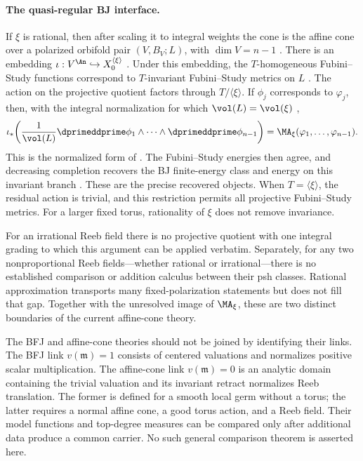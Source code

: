\paragraph{The quasi-regular BJ interface.}
If $\xi$ is rational, then after scaling it to integral weights the cone is
the affine cone over a polarized orbifold pair $(V,B_V;L)$, with
$\dim V=n-1$ \cite[Proposition~2.4]{Wu24AffineCones}.  There is an embedding
$\iota:V^{\An}\hookrightarrow X_0^{\langle\xi\rangle}$
\cite[Lemma~5.11]{Wu22AffineEnergy}.  Under this
embedding, the $T$-homogeneous Fubini--Study functions correspond to
$T$-invariant Fubini--Study metrics on $L$
\cite[Lemma~5.12]{Wu22AffineEnergy}.  The action on the projective quotient
factors through $T/\langle\xi\rangle$.  If $\phi_j$ corresponds to
$\varphi_j$, then, with the integral normalization for which
$\vol(L)=\vol(\xi)$ \cite[Lemma~3.16]{Wu22AffineEnergy},
\[
 \iota_*\!\left(
  \frac{1}{\vol(L)}
  \dprimeddprime\phi_1\wedge\cdots\wedge
  \dprimeddprime\phi_{n-1}
 \right)
 =\MA_\xi(\varphi_1,\ldots,\varphi_{n-1}).
\]
This is the normalized form of
\cite[Proposition~5.13]{Wu22AffineEnergy}.  The Fubini--Study energies then
agree, and decreasing completion recovers the BJ finite-energy class and
energy on this invariant branch
\cite[Corollary~5.14]{Wu22AffineEnergy}
\cite[Corollary~6.6(4)]{Wu24AffineCones}.  These are the precise recovered
objects.  When $T=\langle\xi\rangle$, the residual action is trivial,
and this restriction permits all projective Fubini--Study metrics.  For a
larger fixed torus, rationality of $\xi$ does not remove invariance.

For an irrational Reeb field there is no projective quotient with one
integral grading to which this argument can be applied verbatim.  Separately,
for any two nonproportional Reeb fields---whether rational or
irrational---there is no established comparison or addition calculus between
their psh classes.  Rational approximation transports many
fixed-polarization statements but does not fill that gap.  Together with the
unresolved image of $\MA_\xi$, these are two distinct boundaries of the
current affine-cone theory.

\begin{remark}
\label{rem:local-two-links}
The BFJ and affine-cone theories should not be joined by identifying their
links.  The BFJ link $v(\mathfrak m)=1$ consists of centered valuations and
normalizes positive scalar multiplication.  The affine-cone link
$v(\mathfrak m)=0$ is an analytic domain containing the trivial valuation
and its invariant retract normalizes Reeb translation.  The former is defined for a smooth local
germ without a torus; the latter requires a normal affine cone, a good torus
action, and a Reeb field.  Their model functions and top-degree measures can
be compared only after additional data produce a common carrier.  No such
general comparison theorem is asserted here.
\end{remark}

